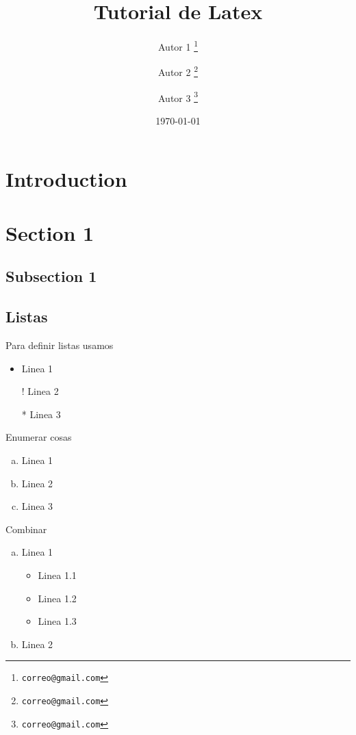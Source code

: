 \documentclass[12pt, letterpaper]{article}
\title{Tutorial de Latex}
\author[a]{Autor 1 \thanks{\texttt{correo@gmail.com}}}
\author[b]{Autor 2 \thanks{\texttt{correo@gmail.com}}}
\author[c]{Autor 3 \thanks{\texttt{correo@gmail.com}}}
\affil[a]{Universidad 1}
\affil[b]{Universidad 2}
\date{\today}
\begin{document}
\maketitle
\begin{abstract}
    \blindtext
\end{abstract}

\newpage
\tableofcontents
\newpage

\section{Introduction}
\blindtext
\section{Section 1}
\blindtext

\subsection{Subsection 1}
\blindtext

\subsection{Listas}

Para definir listas usamos

\begin{itemize}
    \item Linea 1
    \item[!] Linea 2
    \item[*] Linea 3
\end{itemize}

Enumerar cosas

\begin{enumerate}[a)]
    \item Linea 1
    \item Linea 2
    \item Linea 3
\end{enumerate}

Combinar

\begin{enumerate}[a.]
    \item Linea 1
    \begin{itemize}
        \item Linea 1.1
        \item Linea 1.2
        \item Linea 1.3
    \end{itemize}
    \item Linea 2
\end{enumerate}
\end{document}
